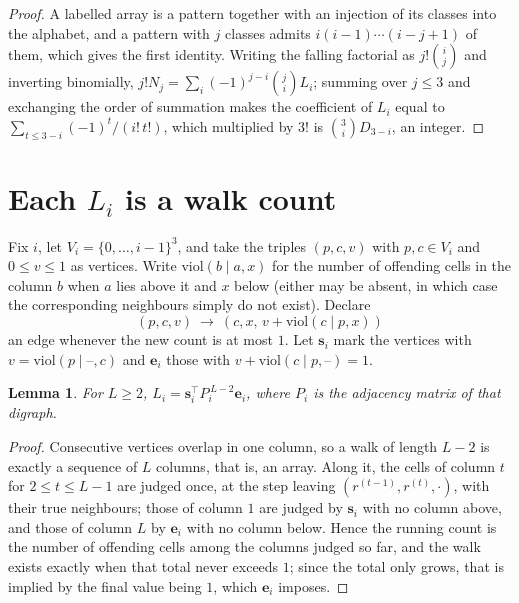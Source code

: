 \documentclass[11pt,a4paper]{article}
\theoremstyle{plain}
\newtheorem{lemma}[theorem]{Lemma}
\theoremstyle{definition}
\begin{document}
\begin{proof}
A labelled array is a pattern together with an injection of its classes into the alphabet,
and a pattern with $j$ classes admits $i(i-1)\cdots(i-j+1)$ of them, which gives the first
identity. Writing the falling factorial as $j!\binom{i}{j}$ and inverting binomially,
$j!N_j=\sum_i(-1)^{j-i}\binom{j}{i}L_i$; summing over $j\le3$ and exchanging the
order of summation makes the coefficient of $L_i$ equal to
$\sum_{t\le3-i}(-1)^t/(i!\,t!)$, which multiplied by $3!$ is
$\binom{3}{i}D_{3-i}$, an integer.
\end{proof}

\section{Each $L_i$ is a walk count}

Fix $i$, let $V_i=\{0,\dots,i-1\}^{3}$, and take the triples $(p,c,v)$ with
$p,c\in V_i$ and $0\le v\le1$ as vertices. Write $\mathrm{viol}(b\mid a,x)$ for the number
of offending cells in the column $b$ when $a$ lies above it and $x$ below (either may be
absent, in which case the corresponding neighbours simply do not exist). Declare
\[
(p,c,v)\ \longrightarrow\ (c,x,\,v+\mathrm{viol}(c\mid p,x))
\]
an edge whenever the new count is at most $1$. Let $\mathbf{s}_i$ mark the vertices with
$v=\mathrm{viol}(p\mid\text{--},c)$ and $\mathbf{e}_i$ those with
$v+\mathrm{viol}(c\mid p,\text{--})=1$.

\begin{lemma}\label{lem:walk}
For $L\ge2$, $L_i=\mathbf{s}_i^{\!\top}P_i^{\,L-2}\mathbf{e}_i$, where $P_i$ is the
adjacency matrix of that digraph.
\end{lemma}

\begin{proof}
Consecutive vertices overlap in one column, so a walk of length $L-2$ is exactly a sequence
of $L$ columns, that is, an array. Along it, the cells of column $t$ for $2\le t\le L-1$ are
judged once, at the step leaving $(r^{(t-1)},r^{(t)},\cdot)$, with their true neighbours;
those of column $1$ are judged by $\mathbf{s}_i$ with no column above, and those of column
$L$ by $\mathbf{e}_i$ with no column below. Hence the running count is the number of
offending cells among the columns judged so far, and the walk exists exactly when that total
never exceeds $1$; since the total only grows, that is implied by the final value being
$1$, which $\mathbf{e}_i$ imposes.
\end{proof}
\end{document}
